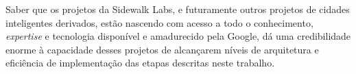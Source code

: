 Saber que os projetos da Sidewalk Labs, e futuramente outros projetos de cidades inteligentes derivados, estão nascendo com acesso a todo o conhecimento, \textit{expertise} e tecnologia disponível e amadurecido pela Google, dá uma credibilidade enorme à capacidade desses projetos de alcançarem níveis de arquitetura e eficiência de implementação das etapas descritas neste trabalho.